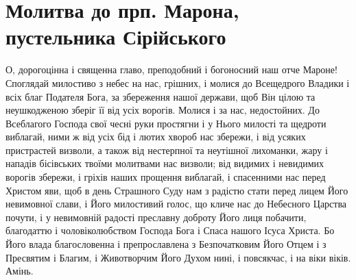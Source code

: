 \documentclass[chapters.tex]{subfiles}
\begin{document}
\section{Молитва до прп. Марона, пустельника Сірійського}
О, дорогоцінна і священна главо, преподобний і богоносний наш отче Мароне! Споглядай милостиво з небес на нас, грішних, і молися до Всещедрого Владики і всіх благ Подателя Бога, за збереження нашої держави, щоб Він цілою та неушкодженою зберіг її від усіх ворогів. Молися і за нас, недостойних. До Всеблагого Господа свої чесні руки простягни і у Нього милості та щедроти виблагай, ними ж від усіх бід і лютих хвороб нас збережи, і від усяких пристрастей визволи, а також від нестерпної та неутішної лихоманки, жару і нападів бісівських твоїми молитвами нас визволи; від видимих і невидимих ворогів збережи, і гріхів наших прощення виблагай, і спасенними нас перед Христом яви, щоб в день Страшного Суду нам з радістю стати перед лицем Його невимовної слави, і Його милостивий голос, що кличе нас до Небесного Царства почути, і у невимовній радості преславну доброту Його лиця побачити, благодаттю і чоловіколюбством Господа Бога і Спаса нашого Ісуса Христа. Бо Його влада благословенна і препрославлена з Безпочатковим Його Отцем і з Пресвятим і Благим, і Животворчим Його Духом нині, і повсякчас, і на віки віків. Амінь.
\end{document}
